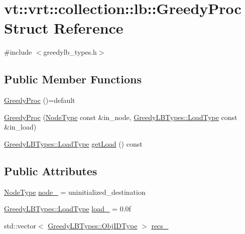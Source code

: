 \hypertarget{structvt_1_1vrt_1_1collection_1_1lb_1_1_greedy_proc}{}\section{vt\+:\+:vrt\+:\+:collection\+:\+:lb\+:\+:Greedy\+Proc Struct Reference}
\label{structvt_1_1vrt_1_1collection_1_1lb_1_1_greedy_proc}


{\ttfamily \#include $<$greedylb\+\_\+types.\+h$>$}

\subsection*{Public Member Functions}
\begin{DoxyCompactItemize}
\item 
\hyperlink{structvt_1_1vrt_1_1collection_1_1lb_1_1_greedy_proc_acbbebf3b853047385b532825ae8f21fe}{Greedy\+Proc} ()=default
\item 
\hyperlink{structvt_1_1vrt_1_1collection_1_1lb_1_1_greedy_proc_a385378e718afd3f52760ebb179cfdb57}{Greedy\+Proc} (\hyperlink{namespacevt_a866da9d0efc19c0a1ce79e9e492f47e2}{Node\+Type} const \&in\+\_\+node, \hyperlink{structvt_1_1vrt_1_1collection_1_1lb_1_1_greedy_l_b_types_a9fe8829bc0c92e88ddf9d149233a54f4}{Greedy\+L\+B\+Types\+::\+Load\+Type} const \&in\+\_\+load)
\item 
\hyperlink{structvt_1_1vrt_1_1collection_1_1lb_1_1_greedy_l_b_types_a9fe8829bc0c92e88ddf9d149233a54f4}{Greedy\+L\+B\+Types\+::\+Load\+Type} \hyperlink{structvt_1_1vrt_1_1collection_1_1lb_1_1_greedy_proc_ab0c43e52a36b0afb41ca821970fd1d34}{get\+Load} () const
\end{DoxyCompactItemize}
\subsection*{Public Attributes}
\begin{DoxyCompactItemize}
\item 
\hyperlink{namespacevt_a866da9d0efc19c0a1ce79e9e492f47e2}{Node\+Type} \hyperlink{structvt_1_1vrt_1_1collection_1_1lb_1_1_greedy_proc_aad516b90985606d8d27ddd89e0109a6a}{node\+\_\+} = uninitialized\+\_\+destination
\item 
\hyperlink{structvt_1_1vrt_1_1collection_1_1lb_1_1_greedy_l_b_types_a9fe8829bc0c92e88ddf9d149233a54f4}{Greedy\+L\+B\+Types\+::\+Load\+Type} \hyperlink{structvt_1_1vrt_1_1collection_1_1lb_1_1_greedy_proc_a139e7722596ed8f891af1b16da8d8f3d}{load\+\_\+} = 0.\+0f
\item 
std\+::vector$<$ \hyperlink{structvt_1_1vrt_1_1collection_1_1lb_1_1_greedy_l_b_types_a201f3d97240fe881e1ed6c0d2cfde262}{Greedy\+L\+B\+Types\+::\+Obj\+I\+D\+Type} $>$ \hyperlink{structvt_1_1vrt_1_1collection_1_1lb_1_1_greedy_proc_a601dd3243831370af2d1e791152902b3}{recs\+\_\+}
\end{DoxyCompactItemize}


